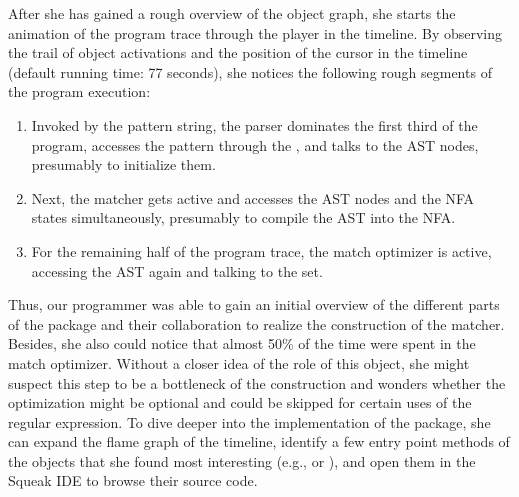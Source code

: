 After she has gained a rough overview of the object graph, she starts the animation of the program trace through the player in the timeline.
By observing the trail of object activations and the position of the cursor in the timeline (default running time: 77 seconds), she notices the following rough segments of the program execution:

\begin{enumerate}
	\item Invoked by the pattern string, the parser dominates the first third of the program, accesses the pattern through the , and talks to the AST nodes, presumably to initialize them.
	\item Next, the matcher gets active and accesses the AST nodes and the NFA states simultaneously, presumably to compile the AST into the NFA.
	\item For the remaining half of the program trace, the match optimizer is active, accessing the AST again and talking to the set.
\end{enumerate}

Thus, our programmer was able to gain an initial overview of the different parts of the  package and their collaboration to realize the construction of the matcher.
Besides, she also could notice that almost 50\si{\percent} of the time were spent in the match optimizer.
Without a closer idea of the role of this object, she might suspect this step to be a bottleneck of the construction and wonders whether the optimization might be optional and could be skipped for certain uses of the regular expression.
To dive deeper into the implementation of the  package, she can expand the flame graph of the timeline, identify a few entry point methods of the objects that she found most interesting (e.g.,  or ), and open them in the Squeak IDE to browse their source code.

